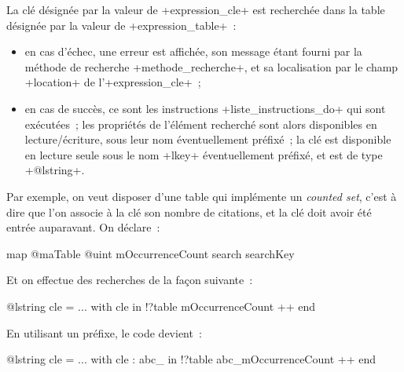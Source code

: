 La clé désignée par la valeur de \ggs+expression_cle+ est recherchée dans la table désignée par la valeur de \ggs+expression_table+~:
\begin{itemize}
  \item en cas d'échec, une erreur est affichée, son message étant fourni par la méthode de recherche \ggs+methode_recherche+, et sa localisation par le champ \ggs+location+ de l'\ggs+expression_cle+~;
  \item en cas de succès, ce sont les instructions \ggs+liste_instructions_do+ qui sont exécutées~; les propriétés de l'élément recherché sont alors disponibles en lecture/écriture, sous leur nom éventuellement préfixé~; la clé est disponible en lecture seule sous le nom \ggs+lkey+ éventuellement préfixé, et est de type \ggs+@lstring+.
\end{itemize}

Par exemple, on veut disposer d'une table qui implémente un \emph{counted set}, c'est à dire que l'on associe à la clé son nombre de citations, et la clé doit avoir été entrée auparavant. On déclare~:
\begin{galgas}
map @maTable {
  @uint mOccurrenceCount
  search searchKey %
}
\end{galgas}

Et on effectue des recherches de la façon suivante~:
\begin{galgas}
@lstring cle = ...
with cle in !?table %
  mOccurrenceCount ++
end
\end{galgas}

En utilisant un préfixe, le code devient~:
\begin{galgas}
@lstring cle = ...
with cle : abc_ in !?table %
  abc_mOccurrenceCount ++
end
\end{galgas}

